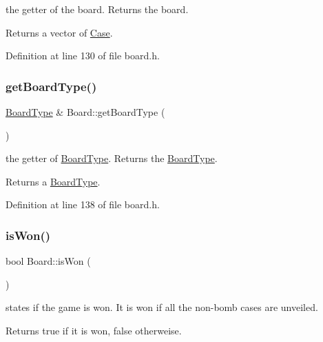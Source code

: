 the getter of the board. Returns the board. 

\begin{DoxyReturn}{Returns}
a vector of \hyperlink{class_case}{Case}. 
\end{DoxyReturn}


Definition at line 130 of file board.\+h.

\mbox{\label{class_board_a30189580d1e2627fc32b40a33db9c5a5}} 
\subsubsection{\texorpdfstring{get\+Board\+Type()}{getBoardType()}}
{\footnotesize\ttfamily \hyperlink{struct_board_type}{Board\+Type} \& Board\+::get\+Board\+Type (\begin{DoxyParamCaption}{ }\end{DoxyParamCaption})\hspace{0.3cm}{\ttfamily [inline]}}



the getter of \hyperlink{struct_board_type}{Board\+Type}. Returns the \hyperlink{struct_board_type}{Board\+Type}. 

\begin{DoxyReturn}{Returns}
a \hyperlink{struct_board_type}{Board\+Type}. 
\end{DoxyReturn}


Definition at line 138 of file board.\+h.

\mbox{\label{class_board_a472731150e19ecdd2d71bcc098037eb8}} 
\subsubsection{\texorpdfstring{is\+Won()}{isWon()}}
{\footnotesize\ttfamily bool Board\+::is\+Won (\begin{DoxyParamCaption}{ }\end{DoxyParamCaption})}



states if the game is won. It is won if all the non-\/bomb cases are unveiled. 

\begin{DoxyReturn}{Returns}
true if it is won, false otherweise. 
\end{DoxyReturn}


